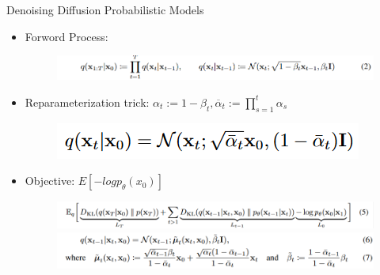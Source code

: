 \documentclass[notheorems, aspectratio=54]{beamer}
\begin{document}
\begin{frame}{Denoising Diffusion Probabilistic Models}
  \begin{itemize}
    \item Forword Process:
    \begin{figure}[!h]
      \centering
      \includegraphics[width=1.0\linewidth]{figures/ddpm_formulation2.png}
    \end{figure}
    \item Reparameterization trick: $ {\alpha}_t := 1-{\beta}_t, \overline{\alpha}_t := \prod \limits_{s=1}^t {\alpha}_s$
    \begin{figure}[!h]
      \centering
      \includegraphics[width=0.5\linewidth]{figures/ddpm_formulation4.png}
    \end{figure}
    \item Objective: $E[-log p_{\theta}(x_0)]$
    \begin{figure}[!h]
      \centering
      \includegraphics[width=1.0\linewidth]{figures/ddpm_formulation5.png}
      \vspace{8mm}
      \includegraphics[width=1.0\linewidth]{figures/ddpm_formulation67.png}
    \end{figure}
  \end{itemize}
\end{frame}
\end{document}
